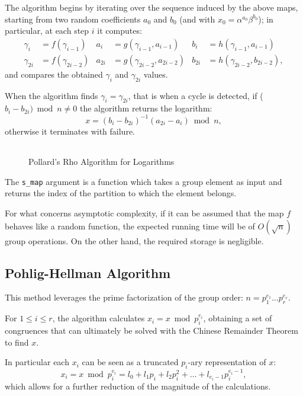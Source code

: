 \documentclass[UTF8]{article}
\begin{document}
The algorithm begins by iterating over the sequence induced by the above maps, starting from two random coefficients $a_0$ and $b_0$ (and with $x_0 = \alpha^{a_0} \beta^{b_0}$); in particular, at each step $i$ it computes:
\begin{align*}
    \gamma_{i}  & = f(\gamma_{i-1})  & a_{i}  & = g(\gamma_{i-1}, a_{i-1})   & b_{i}  & = h(\gamma_{i-1}, a_{i-1})   \\
    \gamma_{2i} & = f(\gamma_{2i-2}) & a_{2i} & = g(\gamma_{2i-2}, a_{2i-2}) & b_{2i} & = h(\gamma_{2i-2}, b_{2i-2}),
\end{align*}
and compares the obtained $\gamma_{i}$ and $\gamma_{2i}$ values.

When the algorithm finds $\gamma_{i} = \gamma_{2i}$, that is when a cycle is detected, if ($b_{i} - b_{2i}) \bmod{n} \not= 0$ the algorithm returns the logarithm:
$$x = (b_{i} - b_{2i})^{-1} (a_{2i} - a_{i}) \bmod{n},$$
otherwise it terminates with failure.

\begin{figure}[H]
    \centering
    \caption{Pollard's Rho Algorithm for Logarithms}
    \begin{tabular}{c}
        
    \end{tabular}
\end{figure}

The \verb|s_map| argument is a function which takes a group element as input and returns the index of the partition to which the element belongs.

For what concerns asymptotic complexity, if it can be assumed that the map $f$ behaves like a random function, the expected running time will be of $O(\sqrt{n})$ group operations. On the other hand, the required storage is negligible.

\subsection{Pohlig-Hellman Algorithm}

This method leverages the prime factorization of the group order: $n = p_1^{e_1} \ldots p_r^{e_r}$.

For $1 \leq i \leq r$, the algorithm calculates $x_i = x \bmod{p_i^{e_i}}$, obtaining a set of congruences that can ultimately be solved with the Chinese Remainder Theorem to find $x$.

In particular each $x_i$ can be seen as a truncated $p_i$-ary representation of $x$:
$$x_i = x \bmod{p_i^{e_i}} = l_0 + l_1 p_i + l_2 p_i^2 + \ldots + l_{e_i - 1} p_i^{e_i - 1},$$
which allows for a further reduction of the magnitude of the calculations.
\end{document}
